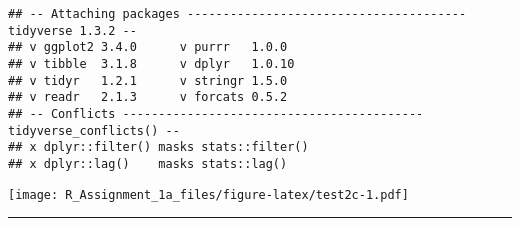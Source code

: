 \documentclass[
]{article}
\newenvironment{Shaded}{\begin{snugshade}}{\end{snugshade}}
\newcommand{\AttributeTok}[1]{\textcolor[rgb]{0.77,0.63,0.00}{#1}}
\newcommand{\DecValTok}[1]{\textcolor[rgb]{0.00,0.00,0.81}{#1}}
\newcommand{\FunctionTok}[1]{\textcolor[rgb]{0.00,0.00,0.00}{#1}}
\newcommand{\NormalTok}[1]{#1}
\newcommand{\OtherTok}[1]{\textcolor[rgb]{0.56,0.35,0.01}{#1}}
\newcommand{\SpecialCharTok}[1]{\textcolor[rgb]{0.00,0.00,0.00}{#1}}
\newcommand{\StringTok}[1]{\textcolor[rgb]{0.31,0.60,0.02}{#1}}
\begin{document}
\begin{verbatim}
## -- Attaching packages --------------------------------------- tidyverse 1.3.2 --
## v ggplot2 3.4.0      v purrr   1.0.0 
## v tibble  3.1.8      v dplyr   1.0.10
## v tidyr   1.2.1      v stringr 1.5.0 
## v readr   2.1.3      v forcats 0.5.2 
## -- Conflicts ------------------------------------------ tidyverse_conflicts() --
## x dplyr::filter() masks stats::filter()
## x dplyr::lag()    masks stats::lag()
\end{verbatim}

\begin{Shaded}
\end{Shaded}

\texttt{[image: R\_Assignment\_1a\_files/figure-latex/test2c-1.pdf]}

\begin{center}\rule{0.5\linewidth}{0.5pt}\end{center}
\end{document}
